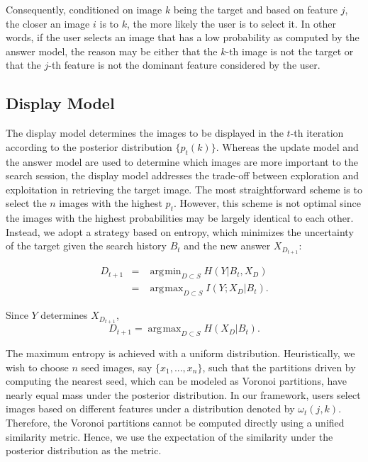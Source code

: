 \documentclass[journal]{IEEEtran}
\DeclareMathOperator*{\argmin}{\arg\!\min}
\DeclareMathOperator*{\argmax}{\arg\!\max}
\begin{document}
Consequently, conditioned on image $k$ being the target and based on feature $j$, the closer an image $i$ is to $k$, the more likely the user is to select it. In other words, if the user selects an image that has a low probability as computed by the answer model, the reason may be either that the $k$-th image is not the target or that the $j$-th feature is not the dominant feature considered by the user.


\subsection{Display Model}\label{subsec::displaymodel}
The display model determines the images to be displayed in the $t$-th iteration according to the posterior distribution $\{p_t(k)\}$. Whereas the update model and the answer model are used to determine which images are more important to the search session, the display model addresses the trade-off between exploration and exploitation in retrieving the target image. The most straightforward scheme is to select the $n$ images with the highest $p_t$. However, this scheme is not optimal since the images with the highest probabilities may be largely identical to each other. Instead, we adopt a strategy based on entropy, which minimizes the uncertainty of the target given the search history $B_t$ and the new answer $X_{D_{t+1}}$:

\begin{eqnarray}
D_{t+1}&=&\argmin_{D\subset S}H(Y|B_t,X_D)\nonumber\\
&=&\argmax_{D\subset S}I(Y;X_D|B_t).
\end{eqnarray}

Since $Y$ determines $X_{D_{t+1}}$,
\begin{equation}
D_{t+1}=\argmax_{D\subset S}H(X_D|B_t).
\end{equation}

The maximum entropy is achieved with a uniform distribution. Heuristically, we wish to choose $n$ seed images, say $\{x_1,...,x_n\}$, such that the partitions driven by computing the nearest seed, which can be modeled as Voronoi partitions, have nearly equal mass under the posterior distribution. In our framework, users select images based on different features under a distribution denoted by $\omega_t(j,k)$. Therefore, the Voronoi partitions cannot be computed directly using a unified similarity metric. Hence, we use the expectation of the similarity under the posterior distribution as the metric.
\end{document}
